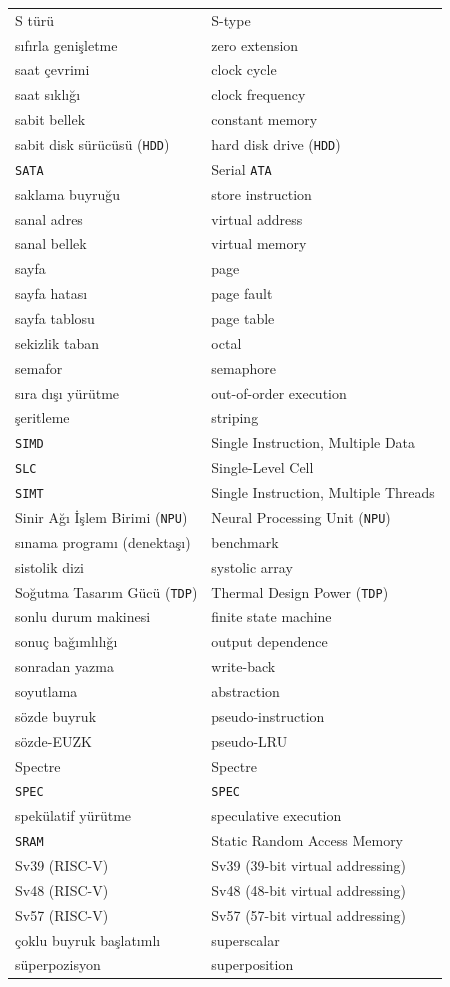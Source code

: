 {\begin{longtable}{@{}p{7.6cm}p{7.6cm}@{}}
S türü & S-type \\
sıfırla genişletme & zero extension \\
saat çevrimi & clock cycle \\
saat sıklığı & clock frequency \\
sabit bellek & constant memory \\
sabit disk sürücüsü (\texttt{HDD}) & hard disk drive (\texttt{HDD}) \\
\texttt{SATA} & Serial \texttt{ATA} \\
saklama buyruğu & store instruction \\
sanal adres & virtual address \\
sanal bellek & virtual memory \\
sayfa & page \\
sayfa hatası & page fault \\
sayfa tablosu & page table \\
sekizlik taban & octal \\
semafor & semaphore \\
sıra dışı yürütme & out-of-order execution \\
şeritleme & striping \\
\texttt{SIMD} & Single Instruction, Multiple Data \\
\texttt{SLC} & Single-Level Cell \\
\texttt{SIMT} & Single Instruction, Multiple Threads \\
Sinir Ağı İşlem Birimi (\texttt{NPU}) & Neural Processing Unit (\texttt{NPU}) \\
sınama programı (denektaşı) & benchmark \\
sistolik dizi & systolic array \\
Soğutma Tasarım Gücü (\texttt{TDP}) & Thermal Design Power (\texttt{TDP}) \\
sonlu durum makinesi & finite state machine \\
sonuç bağımlılığı & output dependence \\
sonradan yazma & write-back \\
soyutlama & abstraction \\
sözde buyruk & pseudo-instruction \\
sözde-EUZK & pseudo-LRU \\
Spectre & Spectre \\
\texttt{SPEC} & \texttt{SPEC} \\
spekülatif yürütme & speculative execution \\
\texttt{SRAM} & Static Random Access Memory \\
Sv39 (RISC-V) & Sv39 (39-bit virtual addressing) \\
Sv48 (RISC-V) & Sv48 (48-bit virtual addressing) \\
Sv57 (RISC-V) & Sv57 (57-bit virtual addressing) \\
çoklu buyruk başlatımlı & superscalar \\
süperpozisyon & superposition \\


\end{longtable}}
